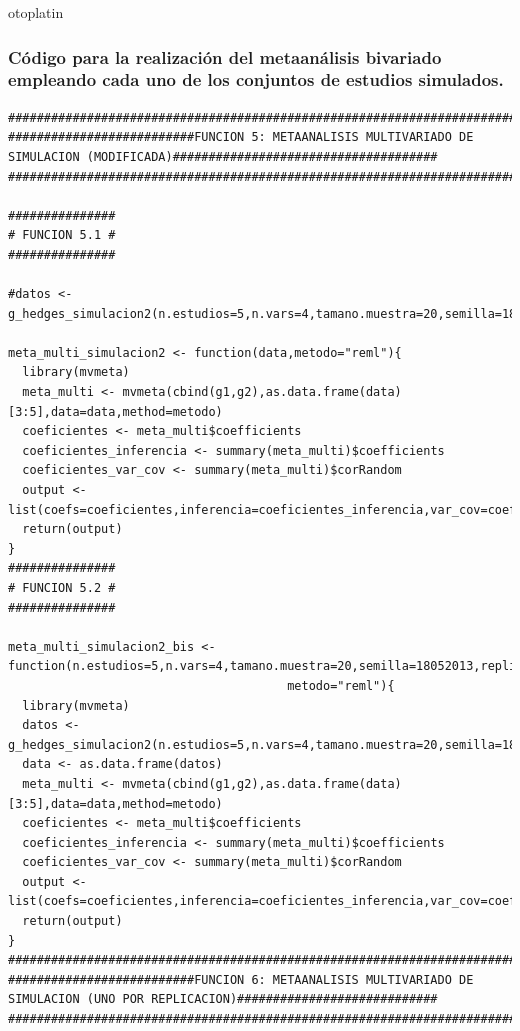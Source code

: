 otoplatin\documentclass[a4paper,openright,12pt]{report}
\begin{document}
\subsubsection{Código para la realización del metaanálisis bivariado empleando cada uno de los conjuntos de estudios simulados.}
{\tiny
\begin{verbatim}
##############################################################################################################################
##########################FUNCION 5: METAANALISIS MULTIVARIADO DE SIMULACION (MODIFICADA)#####################################
##############################################################################################################################

###############
# FUNCION 5.1 #
###############

#datos <- g_hedges_simulacion2(n.estudios=5,n.vars=4,tamano.muestra=20,semilla=18052013,replicaciones=5,correlacion=0)

meta_multi_simulacion2 <- function(data,metodo="reml"){
  library(mvmeta)
  meta_multi <- mvmeta(cbind(g1,g2),as.data.frame(data)[3:5],data=data,method=metodo)
  coeficientes <- meta_multi$coefficients
  coeficientes_inferencia <- summary(meta_multi)$coefficients
  coeficientes_var_cov <- summary(meta_multi)$corRandom
  output <- list(coefs=coeficientes,inferencia=coeficientes_inferencia,var_cov=coeficientes_var_cov)
  return(output)
}
###############
# FUNCION 5.2 #
###############

meta_multi_simulacion2_bis <- function(n.estudios=5,n.vars=4,tamano.muestra=20,semilla=18052013,replicaciones=5,correlacion=0,
                                       metodo="reml"){
  library(mvmeta)
  datos <- g_hedges_simulacion2(n.estudios=5,n.vars=4,tamano.muestra=20,semilla=18052013,replicaciones=5,correlacion=0)
  data <- as.data.frame(datos)
  meta_multi <- mvmeta(cbind(g1,g2),as.data.frame(data)[3:5],data=data,method=metodo)
  coeficientes <- meta_multi$coefficients
  coeficientes_inferencia <- summary(meta_multi)$coefficients
  coeficientes_var_cov <- summary(meta_multi)$corRandom
  output <- list(coefs=coeficientes,inferencia=coeficientes_inferencia,var_cov=coeficientes_var_cov)
  return(output)  
}
##############################################################################################################################
##########################FUNCION 6: METAANALISIS MULTIVARIADO DE SIMULACION (UNO POR REPLICACION)############################
##############################################################################################################################


\end{verbatim}}
\end{document}
